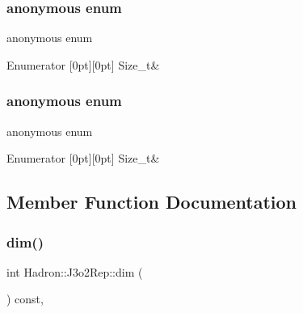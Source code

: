 \subsubsection{\texorpdfstring{anonymous enum}{anonymous enum}}
{\footnotesize\ttfamily anonymous enum}

\begin{DoxyEnumFields}{Enumerator}
[0pt][0pt]{}\mbox{\label{structHadron_1_1J3o2Rep_ac672bfc63013f85b8d513f2c421bec7ca7310ff2bbe90c48e5d307cd3adc0b46e}} 
Size\+\_\+t&\\
\hline

\end{DoxyEnumFields}
\mbox{\label{structHadron_1_1J3o2Rep_ac672bfc63013f85b8d513f2c421bec7c}} 
\subsubsection{\texorpdfstring{anonymous enum}{anonymous enum}}
{\footnotesize\ttfamily anonymous enum}

\begin{DoxyEnumFields}{Enumerator}
[0pt][0pt]{}\mbox{\label{structHadron_1_1J3o2Rep_ac672bfc63013f85b8d513f2c421bec7ca7310ff2bbe90c48e5d307cd3adc0b46e}} 
Size\+\_\+t&\\
\hline

\end{DoxyEnumFields}


\subsection{Member Function Documentation}
\mbox{\label{structHadron_1_1J3o2Rep_a119556341b3fb8bfb4615b3798973c9c}} 
\subsubsection{\texorpdfstring{dim()}{dim()}\hspace{0.1cm}{\footnotesize\ttfamily [1/3]}}
{\footnotesize\ttfamily int Hadron\+::\+J3o2\+Rep\+::dim (\begin{DoxyParamCaption}{ }\end{DoxyParamCaption}) const\hspace{0.3cm}{\ttfamily [inline]}, {\ttfamily [virtual]}}



